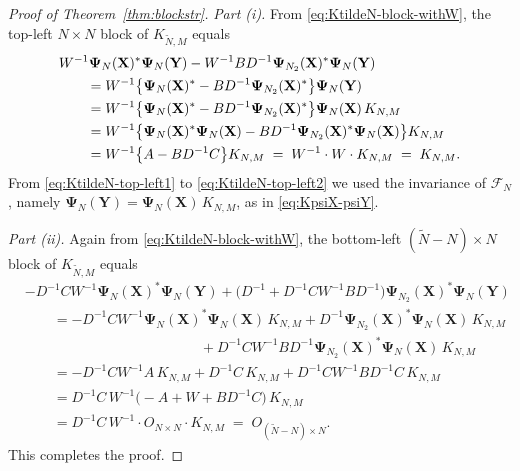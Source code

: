 \documentclass{article}
\theoremstyle{plain}
\theoremstyle{definition}
\def\X{\mathbf{X}}
\def\Y{\mathbf{Y}}
\def\by{\times}
\def\Fc{\mathcal{F}}
\newcommand{\arXivtag}[1][]{#1}
\begin{document}
\begin{proof}[Proof of Theorem~\ref{thm:blockstr}]
	\emph{Part (\textit{i}).} From \eqref{eq:KtildeN-block-withW}, the top-left $N\by N$ block of $K_{\tilde N, M}$ equals
	\begin{align}
		& W^{-1}\mathbf{\Psi}_{N}(\X)^{*}\mathbf{\Psi}_{N}(\Y) - W^{-1}BD^{-1}\arXivtag[\mathbf{\Psi}_{N_2}](\X)^{*}\mathbf{\Psi}_{N}(\Y) \notag \\
		& \qquad = W^{-1}\bigl\{\mathbf{\Psi}_{N}(\X)^{*} - BD^{-1}\arXivtag[\mathbf{\Psi}_{N_2}](\X)^{*}\bigr\}\mathbf{\Psi}_{N}(\Y) \label{eq:KtildeN-top-left1} \\
		& \qquad = W^{-1}\bigl\{\mathbf{\Psi}_{N}(\X)^{*} - BD^{-1}\arXivtag[\mathbf{\Psi}_{N_2}](\X)^{*}\bigr\}\mathbf{\Psi}_{N}(\X)\,K_{N,M} \label{eq:KtildeN-top-left2} \\
		& \qquad = W^{-1}\bigl\{\mathbf{\Psi}_{N}(\X)^{*}\mathbf{\Psi}_{N}(\X) - BD^{-1}\arXivtag[\mathbf{\Psi}_{N_2}](\X)^{*}\mathbf{\Psi}_{N}(\X)\bigr\}K_{N,M} \notag \\
		& \qquad = W^{-1}\bigl\{A - BD^{-1}C\bigr\}K_{N,M} \;=\; W^{-1}\cdot W\cdot K_{N,M} \;=\; K_{N,M}. \notag
	\end{align}
	From \eqref{eq:KtildeN-top-left1} to \eqref{eq:KtildeN-top-left2} we used the invariance of $\Fc_N$, namely $\mathbf{\Psi}_{N}(\Y) = \mathbf{\Psi}_{N}(\X)\,K_{N,M}$, as in \eqref{eq:KpsiX-psiY}.
	
	\emph{Part (\textit{ii}).} Again from \eqref{eq:KtildeN-block-withW}, the bottom-left $(\tilde N - N)\by N$ block of $K_{\tilde N, M}$ equals
	\begin{align*}
		& - D^{-1}CW^{-1}\mathbf{\Psi}_{N}(\X)^{*}\mathbf{\Psi}_{N}(\Y) + \bigl(D^{-1} + D^{-1}CW^{-1}BD^{-1}\bigr)\arXivtag[\mathbf{\Psi}_{N_2}](\X)^{*}\mathbf{\Psi}_{N}(\Y) \\
		& \qquad = -D^{-1}CW^{-1}\mathbf{\Psi}_{N}(\X)^{*}\mathbf{\Psi}_{N}(\X)\,K_{N,M} + D^{-1}\arXivtag[\mathbf{\Psi}_{N_2}](\X)^{*}\mathbf{\Psi}_{N}(\X)\,K_{N,M} \\
		& \qquad\phantom{AAAAAAAAAAAAAA} + D^{-1}CW^{-1}BD^{-1}\arXivtag[\mathbf{\Psi}_{N_2}](\X)^{*}\mathbf{\Psi}_{N}(\X)\,K_{N,M} \\
		& \qquad = -D^{-1}CW^{-1}A\,K_{N,M} + D^{-1}C\,K_{N,M} + D^{-1}CW^{-1}BD^{-1}C\,K_{N,M} \\
		& \qquad = D^{-1}C\,W^{-1}\bigl(-A + W + BD^{-1}C\bigr)\,K_{N,M} \\
		& \qquad = D^{-1}C\,W^{-1}\cdot O_{N\by N}\cdot K_{N,M} \;=\; O_{(\tilde N - N)\times N}.
	\end{align*}
	This completes the proof.
\end{proof}
\end{document}
